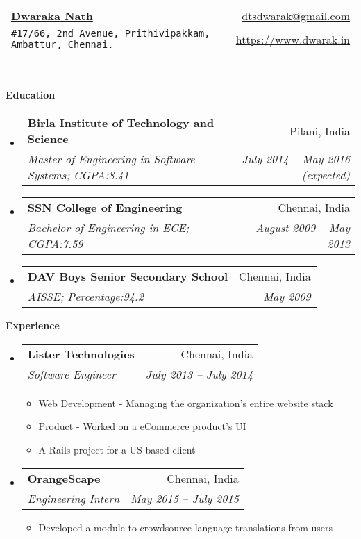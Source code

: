 \documentclass[letterpaper,11pt]{article}
\makeatletter
\newcommand{\resitem}[1]{\item #1 \vspace{-2pt}}
\newcommand{\resheading}[1]{{\large \colorbox{mygrey}{\begin{minipage}{\textwidth}{\textbf{#1 \vphantom{p\^{E}}}}\end{minipage}}}}
\newcommand{\ressubheading}[4]{
\begin{tabular*}{6.5in}{l@{\extracolsep{\fill}}r}
		\textbf{#1} & #2 \\
		\textit{#3} & \textit{#4} \\
\end{tabular*}\vspace{-6pt}}
\makeatother
\begin{document}
\newcommand{\mywebheader}{
\begin{tabular*}{7in}{l@{\extracolsep{\fill}}r}
	\textbf{\href{https://www.dwarak.in/}{\LARGE Dwaraka Nath}} & \href{mailto:dtsdwarak@gmail.com}{dtsdwarak@gmail.com}\\
	{\footnotesize \texttt{\#17/66, 2nd Avenue, Prithivipakkam, Ambattur, Chennai.}} & \href{https://www.dwarak.in}{https://www.dwarak.in} \\
	\end{tabular*}
\\
\vspace{0.1in}}

\mywebheader

\resheading{Education}
	\begin{itemize}
		\item
			\ressubheading{{Birla Institute of Technology and Science}}{Pilani, India}{{Master of Engineering in Software Systems};{ CGPA:8.41}}{July 2014 -- May 2016 (expected)}
		\item
			\ressubheading{{SSN College of Engineering}}{Chennai, India}{{Bachelor of Engineering in ECE};{ CGPA:7.59}}{August 2009 -- May 2013}
		\item
			\ressubheading{{DAV Boys Senior Secondary School}}{Chennai, India}{{AISSE};{ Percentage:94.2}}{May 2009}			
	\end{itemize} %


\resheading{Experience}
	\begin{itemize}
		\item 
			\ressubheading{{Lister Technologies}}{Chennai, India}
				{Software Engineer}{July 2013 -- July 2014}
				{ \footnotesize
				\begin{itemize}
					\resitem{Web Development - Managing the organization's entire website stack}
					\resitem{Product - Worked on a eCommerce product's UI}
					\resitem{A Rails project for a US based client}
				\end{itemize}
				}
        \item 
			\ressubheading{{OrangeScape}}{Chennai, India}
				{Engineering Intern}{May 2015 -- July 2015}
				{ \footnotesize
				\begin{itemize}
					\resitem{Developed a module to crowdsource language translations from users}
				\end{itemize}
				}
	\end{itemize}  %
\end{document}
